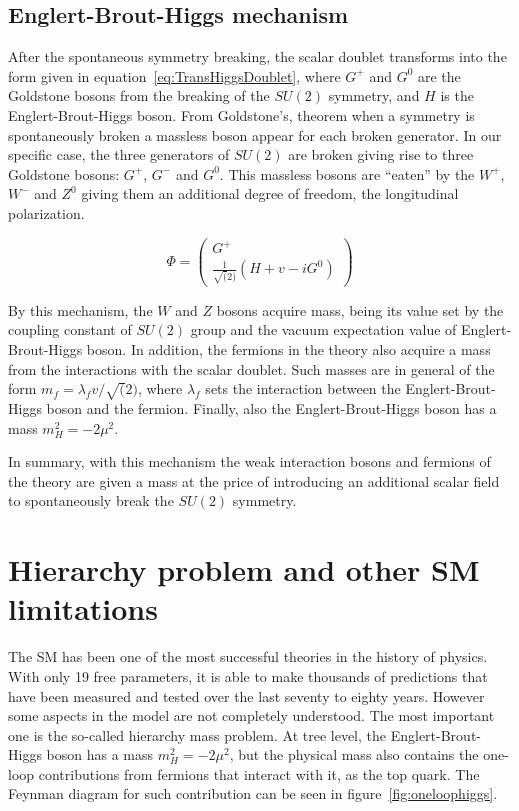 \subsection{Englert-Brout-Higgs mechanism}
\label{sec:higgs}

After the spontaneous symmetry breaking, the scalar doublet transforms into the form given in equation~\ref{eq:TransHiggsDoublet}, where $G^{+}$ and $G^{0}$ are the Goldstone bosons from the breaking of the $SU(2)$ symmetry, and $H$ is the Englert-Brout-Higgs boson. From Goldstone's, theorem when a symmetry is spontaneously broken a massless boson appear for each broken generator. In our specific case, the three generators of $SU(2)$ are broken giving rise to three Goldstone bosons: $G^{+}$, $G^{-}$ and $G^{0}$. This massless bosons are ``eaten'' by the $W^{+}$, $W^{-}$ and $Z^{0}$ giving them an additional degree of freedom, the longitudinal polarization. 

\begin{equation}
  \label{eq:TransHiggsDoublet}
  \Phi=\left(
    \begin{array}{c}
      G^{+} \\
      \frac{1}{\sqrt(2)}(H+v-iG^{0})
    \end{array}
  \right)
\end{equation}

By this mechanism, the $W$ and $Z$ bosons acquire mass, being its value set by the coupling constant of $SU(2)$ group and the vacuum expectation value of Englert-Brout-Higgs boson. In addition, the fermions in the theory also acquire a mass from the interactions with the scalar doublet. Such masses are in general of the form $m_{f}=\lambda_{f}v/\sqrt(2)$, where $\lambda_{f}$ sets the interaction between the Englert-Brout-Higgs boson and the fermion. Finally, also the Englert-Brout-Higgs boson has a mass $m_{H}^{2}=-2\mu^{2}$.

In summary, with this mechanism the weak interaction bosons and fermions of the theory are given a mass at the price of introducing an additional scalar field to spontaneously break the $SU(2)$ symmetry.

\section{Hierarchy problem and other SM limitations}
\label{sec:hier}

The SM has been one of the most successful theories in the history of physics. With only 19 free parameters, it is able to make thousands of predictions that have been measured and tested over the last seventy to eighty years. However some aspects in the model are not completely understood. The most important one is the so-called hierarchy mass problem. At tree level, the Englert-Brout-Higgs boson has a mass $m_{H}^{2}=-2\mu^{2}$, but the physical mass also contains the one-loop contributions from fermions that interact with it, as the top quark. The Feynman diagram for such contribution can be seen in figure~\ref{fig:oneloophiggs}.

